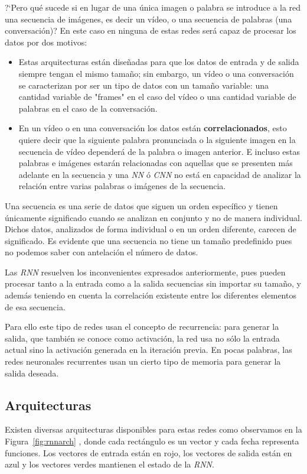 \documentclass[a4paper,12pt]{article}
\begin{document}
?`Pero qué sucede si en lugar de una única imagen o palabra se introduce a la red una secuencia de imágenes, es decir un vídeo, o una secuencia de palabras (una conversación)? En este caso en ninguna de estas redes será capaz de procesar los datos por dos motivos:
\begin{itemize}[noitemsep, topsep=2pt]
	\item Estas arquitecturas están diseñadas para que los datos de entrada y de salida siempre tengan el mismo tamaño; sin embargo, un vídeo o una conversación se caracterizan por ser un tipo de datos con un tamaño variable: una cantidad variable de "frames"
en el caso del vídeo o una cantidad variable de palabras en el caso de la conversación. 
	\item En un vídeo o en una conversación los datos están \textbf{correlacionados}, esto quiere decir que la siguiente palabra pronunciada o la siguiente imagen en la secuencia de vídeo dependerá de la palabra o imagen anterior. E incluso estas palabras e imágenes estarán relacionadas con aquellas que se presenten más adelante en la secuencia y una \textit{NN} ó \textit{CNN} no está en capacidad de analizar la relación entre varias palabras o imágenes de la secuencia.
\end{itemize}

Una secuencia es una serie de datos que siguen un orden específico y tienen únicamente significado cuando se analizan en conjunto y no de manera individual. Dichos datos, analizados de forma individual o en un orden diferente, carecen de significado. Es evidente que una secuencia no tiene un tamaño predefinido pues no podemos saber con antelación el número de datos. 

Las \textit{RNN} resuelven los inconvenientes expresados anteriormente, pues pueden procesar tanto a la entrada como a la salida secuencias sin importar su tamaño, y además teniendo en cuenta la correlación existente entre los diferentes elementos de esa secuencia.

Para ello este tipo de redes usan el concepto de recurrencia: para generar la salida, que también se conoce como activación, la red usa no sólo la entrada actual sino la activación generada en la iteración previa. En pocas palabras, las redes neuronales recurrentes usan un cierto tipo de memoria para generar la salida deseada. 

\subsection{Arquitecturas} \label{rnnarchitecture}
Existen diversas arquitecturas disponibles para estas redes como observamos en la Figura~\ref{fig:rnnarch} \cite{karpathy:rnn}, donde cada rectángulo es un vector y cada fecha representa funciones. Los vectores de entrada están en rojo, los vectores de salida están en azul y los vectores verdes mantienen el estado de la \textit{RNN}.
\end{document}
